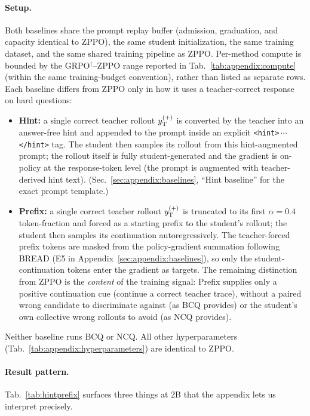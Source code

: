 \documentclass{llmxive}
\begin{document}
\paragraph{Setup.}
Both baselines share the prompt replay buffer (admission, graduation, and capacity identical to ZPPO), the same student initialization, the same training dataset, and the same shared training pipeline as ZPPO. Per-method compute is bounded by the GRPO$^{\dagger}$--ZPPO range reported in Tab.~\ref{tab:appendix:compute} (within the same training-budget convention), rather than listed as separate rows. Each baseline differs from ZPPO only in how it uses a teacher-correct response on hard questions:
\begin{itemize}[leftmargin=12pt,topsep=2pt,itemsep=2pt]
    \item \textbf{Hint:} a single correct teacher rollout $y_{\rm T}^{(+)}$ is converted by the teacher into an answer-free hint and appended to the prompt inside an explicit \texttt{<hint>}\,$\cdots$\,\texttt{</hint>} tag. The student then samples its rollout from this hint-augmented prompt; the rollout itself is fully student-generated and the gradient is on-policy at the response-token level (the prompt is augmented with teacher-derived hint text). (Sec.~\ref{sec:appendix:baselines}, ``Hint baseline'' for the exact prompt template.)
    \item \textbf{Prefix:} a single correct teacher rollout $y_{\rm T}^{(+)}$ is truncated to its first $\alpha\!=\!0.4$ token-fraction and forced as a starting prefix to the student's rollout; the student then samples its continuation autoregressively. The teacher-forced prefix tokens are masked from the policy-gradient summation following BREAD (E5 in Appendix~\ref{sec:appendix:baselines}), so only the student-continuation tokens enter the gradient as targets. The remaining distinction from ZPPO is the \emph{content} of the training signal: Prefix supplies only a positive continuation cue (continue a correct teacher trace), without a paired wrong candidate to discriminate against (as BCQ provides) or the student's own collective wrong rollouts to avoid (as NCQ provides).
\end{itemize}
Neither baseline runs BCQ or NCQ. All other hyperparameters (Tab.~\ref{tab:appendix:hyperparameters}) are identical to ZPPO.

\paragraph{Result pattern.}
Tab.~\ref{tab:hintprefix} surfaces three things at $2$B that the appendix lets us interpret precisely.
\end{document}
